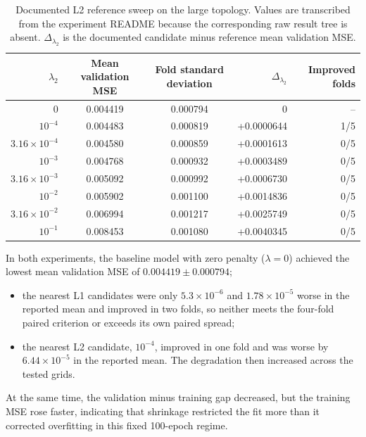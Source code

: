 \begin{table}[h!]
    \centering
    \begin{tabular}{rccrr}
        \hline
        $\lambda_2$ & Mean validation MSE & Fold standard deviation & $\Delta_{\lambda_2}$ & Improved folds \\
        \hline
        0 & 0.004419 & 0.000794 & 0 & -- \\
        $10^{-4}$ & 0.004483 & 0.000819 & +0.0000644 & 1/5 \\
        $3.16\times10^{-4}$ & 0.004580 & 0.000859 & +0.0001613 & 0/5 \\
        $10^{-3}$ & 0.004768 & 0.000932 & +0.0003489 & 0/5 \\
        $3.16\times10^{-3}$ & 0.005092 & 0.000992 & +0.0006730 & 0/5 \\
        $10^{-2}$ & 0.005902 & 0.001100 & +0.0014836 & 0/5 \\
        $3.16\times10^{-2}$ & 0.006994 & 0.001217 & +0.0025749 & 0/5 \\
        $10^{-1}$ & 0.008453 & 0.001080 & +0.0040345 & 0/5 \\
        \hline
    \end{tabular}
    \caption{Documented L2 reference sweep on the large topology. Values are transcribed from the experiment README because the corresponding raw result tree is absent. $\Delta_{\lambda_2}$ is the documented candidate minus reference mean validation MSE.}
    \label{tab:04_l2_results}
\end{table}

In both experiments, the baseline model with zero penalty ($\lambda=0$) achieved the lowest mean validation MSE of $0.004419 \pm 0.000794$; 
\begin{itemize}
    \item[-] the nearest L1 candidates were only $5.3\times10^{-6}$ and $1.78\times10^{-5}$ worse in the reported mean and improved in two folds, so neither meets the four-fold paired criterion or exceeds its own paired spread;
    \item[-] the nearest L2 candidate, $10^{-4}$, improved in one fold and was worse by $6.44\times10^{-5}$ in the reported mean. The degradation then increased across the tested grids.
\end{itemize}
At the same time, the validation minus training gap decreased, but the training MSE rose faster, indicating that shrinkage restricted the fit more than it corrected overfitting in this fixed 100-epoch regime.\\

